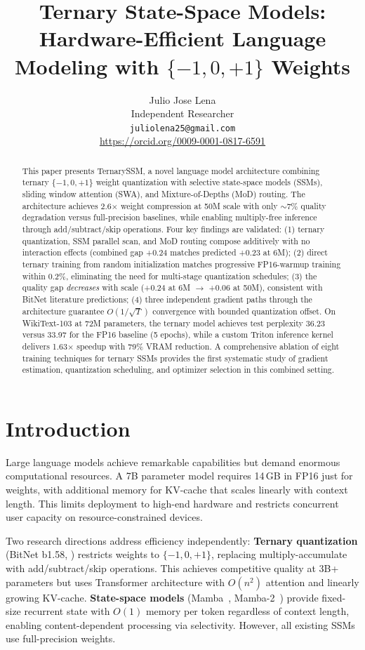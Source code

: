 \documentclass{article}
\title{Ternary State-Space Models: Hardware-Efficient Language Modeling with $\{-1, 0, +1\}$ Weights}
\author{
  Julio Jose Lena \\
  Independent Researcher \\
  \texttt{juliolena25@gmail.com} \\
  \url{https://orcid.org/0009-0001-0817-6591}
}
\begin{document}
\maketitle

\begin{abstract}
This paper presents TernarySSM, a novel language model architecture combining ternary $\{-1, 0, +1\}$ weight quantization with selective state-space models (SSMs), sliding window attention (SWA), and Mixture-of-Depths (MoD) routing. The architecture achieves 2.6$\times$ weight compression at 50M scale with only ${\sim}$7\% quality degradation versus full-precision baselines, while enabling multiply-free inference through add/subtract/skip operations. Four key findings are validated: (1) ternary quantization, SSM parallel scan, and MoD routing compose additively with no interaction effects (combined gap +0.24 matches predicted +0.23 at 6M); (2) direct ternary training from random initialization matches progressive FP16-warmup training within 0.2\%, eliminating the need for multi-stage quantization schedules; (3) the quality gap \emph{decreases} with scale (+0.24 at 6M $\to$ +0.06 at 50M), consistent with BitNet literature predictions; (4) three independent gradient paths through the architecture guarantee $O(1/\sqrt{T})$ convergence with bounded quantization offset. On WikiText-103 at 72M parameters, the ternary model achieves test perplexity 36.23 versus 33.97 for the FP16 baseline (5 epochs), while a custom Triton inference kernel delivers 1.63$\times$ speedup with 79\% VRAM reduction. A comprehensive ablation of eight training techniques for ternary SSMs provides the first systematic study of gradient estimation, quantization scheduling, and optimizer selection in this combined setting.
\end{abstract}

\section{Introduction}

Large language models achieve remarkable capabilities but demand enormous computational resources. A 7B parameter model requires 14\,GB in FP16 just for weights, with additional memory for KV-cache that scales linearly with context length. This limits deployment to high-end hardware and restricts concurrent user capacity on resource-constrained devices.

Two research directions address efficiency independently: \textbf{Ternary quantization} (BitNet b1.58, \citet{ma2024era}) restricts weights to $\{-1, 0, +1\}$, replacing multiply-accumulate with add/subtract/skip operations. This achieves competitive quality at 3B+ parameters but uses Transformer architecture with $O(n^2)$ attention and linearly growing KV-cache. \textbf{State-space models} (Mamba~\citep{gu2024mamba}, Mamba-2~\citep{dao2024transformers}) provide fixed-size recurrent state with $O(1)$ memory per token regardless of context length, enabling content-dependent processing via selectivity. However, all existing SSMs use full-precision weights.
\end{document}
